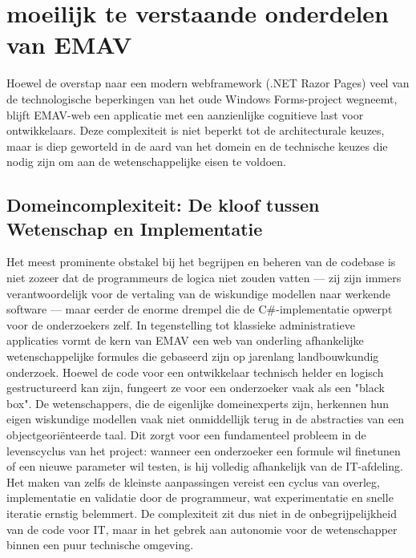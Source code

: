 \chapter{moeilijk te verstaande onderdelen van EMAV}
Hoewel de overstap naar een modern webframework (.NET Razor Pages) veel van de technologische beperkingen van het oude Windows Forms-project wegneemt, blijft EMAV-web een applicatie met een aanzienlijke cognitieve last voor ontwikkelaars. Deze complexiteit is niet beperkt tot de architecturale keuzes, maar is diep geworteld in de aard van het domein en de technische keuzes die nodig zijn om aan de wetenschappelijke eisen te voldoen.
\section{Domeincomplexiteit: De kloof tussen Wetenschap en Implementatie}
Het meest prominente obstakel bij het begrijpen en beheren van de codebase is niet zozeer dat de programmeurs de logica niet zouden vatten — zij zijn immers verantwoordelijk voor de vertaling van de wiskundige modellen naar werkende software — maar eerder de enorme drempel die de C\#-implementatie opwerpt voor de onderzoekers zelf. In tegenstelling tot klassieke administratieve applicaties vormt de kern van EMAV een web van onderling afhankelijke wetenschappelijke formules die gebaseerd zijn op jarenlang landbouwkundig onderzoek.
Hoewel de code voor een ontwikkelaar technisch helder en logisch gestructureerd kan zijn, fungeert ze voor een onderzoeker vaak als een "black box". De wetenschappers, die de eigenlijke domeinexperts zijn, herkennen hun eigen wiskundige modellen vaak niet onmiddellijk terug in de abstracties van een objectgeoriënteerde taal. Dit zorgt voor een fundamenteel probleem in de levenscyclus van het project: wanneer een onderzoeker een formule wil finetunen of een nieuwe parameter wil testen, is hij volledig afhankelijk van de IT-afdeling. Het maken van zelfs de kleinste aanpassingen vereist een cyclus van overleg, implementatie en validatie door de programmeur, wat experimentatie en snelle iteratie ernstig belemmert. De complexiteit zit dus niet in de onbegrijpelijkheid van de code voor IT, maar in het gebrek aan autonomie voor de wetenschapper binnen een puur technische omgeving.
